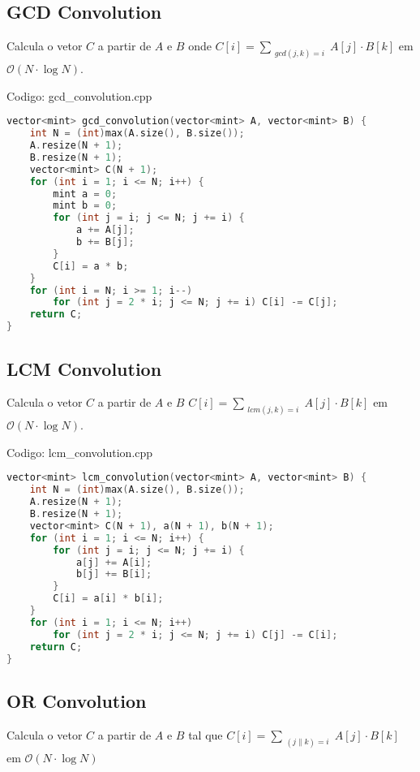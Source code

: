 \documentclass[10pt, a4paper, oneside]{book}
\begin{document}
\subsection{GCD Convolution}


Calcula o vetor $C$ a partir de $A$ e $B$ onde $C[i] = \sum_{\substack{gcd(j, k) = i}} A[j] \cdot B[k]$ em $\mathcal{O}(N \cdot \log N)$.

\hfill

Codigo: gcd\_convolution.cpp

\begin{lstlisting}[language=C++]
vector<mint> gcd_convolution(vector<mint> A, vector<mint> B) {
    int N = (int)max(A.size(), B.size());
    A.resize(N + 1);
    B.resize(N + 1);
    vector<mint> C(N + 1);
    for (int i = 1; i <= N; i++) {
        mint a = 0;
        mint b = 0;
        for (int j = i; j <= N; j += i) {
            a += A[j];
            b += B[j];
        }
        C[i] = a * b;
    }
    for (int i = N; i >= 1; i--)
        for (int j = 2 * i; j <= N; j += i) C[i] -= C[j];
    return C;
}
\end{lstlisting}
\hfill

\subsection{LCM Convolution}


Calcula o vetor $C$ a partir de $A$ e $B$ $C[i] = \sum_{\substack{lcm(j, k) = i}} A[j] \cdot B[k]$ em $\mathcal{O}(N \cdot \log N)$.

\hfill

Codigo: lcm\_convolution.cpp

\begin{lstlisting}[language=C++]
vector<mint> lcm_convolution(vector<mint> A, vector<mint> B) {
    int N = (int)max(A.size(), B.size());
    A.resize(N + 1);
    B.resize(N + 1);
    vector<mint> C(N + 1), a(N + 1), b(N + 1);
    for (int i = 1; i <= N; i++) {
        for (int j = i; j <= N; j += i) {
            a[j] += A[i];
            b[j] += B[i];
        }
        C[i] = a[i] * b[i];
    }
    for (int i = 1; i <= N; i++)
        for (int j = 2 * i; j <= N; j += i) C[j] -= C[i];
    return C;
}
\end{lstlisting}
\hfill

\subsection{OR Convolution}


Calcula o vetor $C$ a partir de $A$ e $B$ tal que $C[i] = \sum_{\substack{(j \| k) = i}} A[j] \cdot B[k]$ em $\mathcal{O}(N \cdot \log N)$
\end{document}

